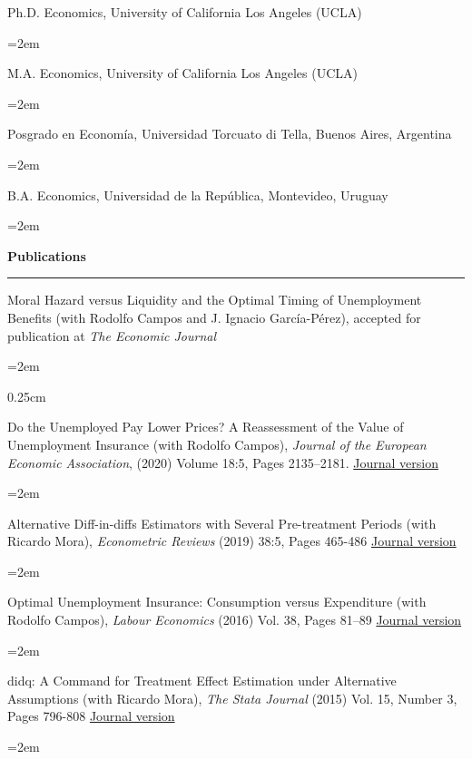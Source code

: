 \documentclass[12pt]{article}
\newcommand{\sepspace}{\vspace*{1em}}		%
\newcommand{\NewPart}[1]{ \vspace*{0.4cm} \noindent \large \textbf{#1}
\par \normalsize \normalfont \vspace*{-0.5cm} \noindent\rule{\textwidth}{1.8pt} \vspace*{-0.75cm} }
\newcommand{\EducationEntry}[4]{
		\noindent #1 \hfill      %
		\noindent #2 %
		\noindent \textit{#3} \par        %
		\noindent\hangindent=2em\hangafter=0  #4 %
		\normalsize \par}
\begin{document}
\EducationEntry{Ph.D. Economics, University of California Los Angeles (UCLA)}{2008}{}{}

\EducationEntry{M.A. Economics, University of California Los Angeles (UCLA)}{2004}{}{}

\EducationEntry{Posgrado en Econom\'ia, Universidad Torcuato di Tella, Buenos Aires, Argentina}{2001}{}{}

\EducationEntry{B.A. Economics, Universidad de la República, Montevideo, Uruguay}{1999}{}{}

\vspace*{-0.25cm}
\NewPart{Publications}{}

\vspace*{0.25cm}

\EducationEntry{Moral Hazard versus Liquidity and the Optimal Timing of Unemployment Benefits (with Rodolfo Campos and J. Ignacio García-Pérez), accepted for publication at \textit{The Economic Journal }}{}{}


\vspace*{0.25cm}

\EducationEntry{Do the Unemployed Pay Lower Prices? A Reassessment of the Value of Unemployment Insurance (with Rodolfo Campos), \textit{Journal of the European Economic Association}, (2020) Volume 18:5, Pages 2135–2181.} {\href{https://academic.oup.com/jeea/advance-article/doi/10.1093/jeea/jvz043/5607409?guestAccessKey=14e0bd06-6410-43f0-aa64-677e87dfef66}{Journal version}}{}{}

\vspace*{-0.25cm}


\EducationEntry{Alternative Diff-in-diffs Estimators with Several Pre-treatment Periods (with Ricardo Mora), \textit{Econometric Reviews} (2019) 38:5, Pages 465-486}{\href{http://www.tandfonline.com/doi/abs/10.1080/07474938.2017.1348683}{Journal version}}{}{}

\vspace*{-0.25cm}

\EducationEntry{Optimal Unemployment Insurance: Consumption versus Expenditure (with Rodolfo Campos), \textit{Labour Economics} (2016) Vol. 38, Pages 81–89}{\href{https://www.sciencedirect.com/science/article/abs/pii/S0927537115001232}{Journal version}}{}{}

\vspace*{-0.25cm}

\EducationEntry{didq: A Command for Treatment Effect Estimation under Alternative Assumptions (with Ricardo Mora), \textit{The Stata Journal} (2015) Vol. 15, Number 3, Pages 796-808}{\href{https://www.stata-journal.com/article.html?article=st0405}{Journal version}}{}{}
\end{document}
